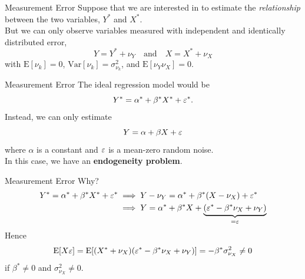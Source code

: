 \begin{frame}{Measurement Error}
    Suppose that we are interested in to estimate the \textit{relationship} between the two variables, $Y^{*}$ and $X^{*}$.\\
    \vspace{3mm}
    But we can only observe variables measured with independent and identically distributed error,
    \[
    Y=Y^{*} + \nu_{Y} \quad \text{and} \quad X = X^{*} + \nu_{X}
    \]
     with $\text{E}[\nu_{k}]=0$, $\text{Var}[\nu_{k}] = \sigma^{2}_{\nu_{k}}$, and $\text{E}[\nu_{Y}\nu_{X}] = 0$.
\end{frame}

\begin{frame}{Measurement Error}
    The ideal regression model would be
    \[
    Y^{*} = \alpha^{*} + \beta^{*} X^{*} + \varepsilon^{*}.
    \]
    Instead, we can only estimate
    \[
    Y = \alpha + \beta X + \varepsilon
    \]
    where $\alpha$ is a constant and $\varepsilon$ is a mean-zero random noise.\\
    \vspace{3mm}
    In this case, we have an \textbf{endogeneity problem}.
\end{frame}

\begin{frame}{Measurement Error}
Why?
    \begin{equation*}\begin{split}
    Y^{*} = \alpha^{*} + \beta^{*} X^{*} + \varepsilon^{*}
    &\implies Y-\nu_{Y} = \alpha^{*} + \beta^{*} (X-\nu_{X}) + \varepsilon^{*} \\
    &\implies Y = \alpha^{*} + \beta^{*} X + \underbrace{(\varepsilon^{*} - \beta^{*}\nu_{X} + \nu_{Y})}_{=\varepsilon}
\end{split}\end{equation*}
Hence
\begin{equation*}\begin{split}
    \text{E}[X\varepsilon]
    = \text{E}[(X^{*}+\nu_{X}) (\varepsilon^{*} - \beta^{*}\nu_{X} + \nu_{Y})]
    = -\beta^{*} \sigma^{2}_{\nu_{X}} \neq 0
\end{split}
\end{equation*}
if $\beta^{*}\neq 0$ and $\sigma^{2}_{\nu_{X}} \neq 0$.
\end{frame}

